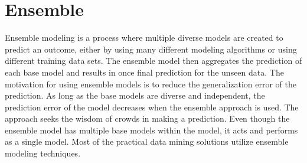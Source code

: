 \section{Ensemble}
Ensemble modeling is a process where multiple diverse models are created to predict an outcome, either by using many different modeling algorithms or using different training data sets. The ensemble model then aggregates the prediction of each base model and results in once final prediction for the unseen data. The motivation for using ensemble models is to reduce the generalization error of the prediction. As long as the base models are diverse and independent, the prediction error of the model decreases when the ensemble approach is used. The approach seeks the wisdom of crowds in making a prediction. Even though the ensemble model has multiple base models within the model, it acts and performs as a single model. Most of the practical data mining solutions utilize ensemble modeling techniques. \cite{KOTU201517}






{}
\specialsection %
\headerspecialsection

{\hypersetup{urlcolor=ntnu,linkcolor=sophia} %

  
}
